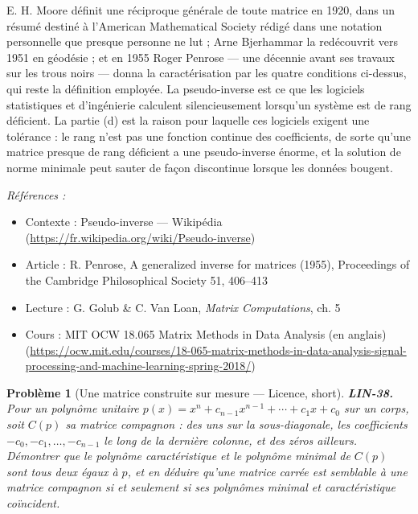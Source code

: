 \documentclass[11pt]{article}
\newtheorem{problem}{Problème}
\newenvironment{refs}{\par\small\noindent\emph{Références :}\begin{itemize}\setlength\itemsep{0pt}}{\end{itemize}\normalsize}
\begin{document}
\noindent E. H. Moore définit une \og{} réciproque générale \fg{} de toute matrice en 1920, dans un
résumé destiné à l'American Mathematical Society rédigé dans une notation personnelle que presque
personne ne lut ; Arne Bjerhammar la redécouvrit vers 1951 en géodésie ; et en 1955 Roger Penrose ---
une décennie avant ses travaux sur les trous noirs --- donna la caractérisation par les quatre
conditions ci-dessus, qui reste la définition employée. La pseudo-inverse est ce que les logiciels
statistiques et d'ingénierie calculent silencieusement lorsqu'un système est de rang déficient. La
partie (d) est la raison pour laquelle ces logiciels exigent une tolérance : le rang n'est pas une
fonction continue des coefficients, de sorte qu'une matrice presque de rang déficient a une
pseudo-inverse énorme, et la \og{} solution de norme minimale \fg{} peut sauter de façon discontinue lorsque
les données bougent.

\begin{refs}
\item Contexte : Pseudo-inverse --- Wikipédia (\url{https://fr.wikipedia.org/wiki/Pseudo-inverse})
\item Article : R. Penrose, \og{} A generalized inverse for matrices \fg{} (1955), Proceedings of the Cambridge Philosophical Society 51, 406--413
\item Lecture : G. Golub \& C. Van Loan, \textit{Matrix Computations}, ch. 5
\item Cours : MIT OCW 18.065 Matrix Methods in Data Analysis (en anglais) (\url{https://ocw.mit.edu/courses/18-065-matrix-methods-in-data-analysis-signal-processing-and-machine-learning-spring-2018/})
\end{refs}

\bigskip

\begin{problem}[{Une matrice construite sur mesure --- Licence, short}]
\textbf{LIN-38.} Pour un polynôme unitaire
$p(x) = x^n + c_{n-1}x^{n-1} + \cdots + c_1 x + c_0$ sur un corps, soit $C(p)$ sa matrice
compagnon : des uns sur la sous-diagonale, les coefficients $-c_0, -c_1, \dots, -c_{n-1}$ le long de
la dernière colonne, et des zéros ailleurs. Démontrer que le polynôme caractéristique et le polynôme
minimal de $C(p)$ sont tous deux égaux à $p$, et en déduire qu'une matrice carrée est semblable à
une matrice compagnon si et seulement si ses polynômes minimal et caractéristique coïncident.
\end{problem}
\end{document}
